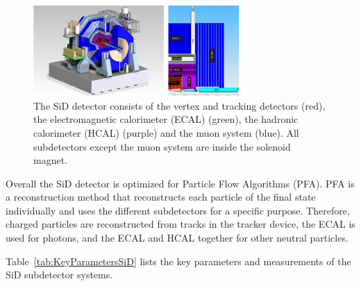 \begin{figure}
\centering
\includegraphics[width=0.7\textwidth]{Figures/SiD.png}
\caption[Schematic drawing of the SiD detector]{The SiD detector consists of the vertex and tracking detectors (red), the electromagnetic calorimeter (ECAL) (green), the hadronic calorimeter (HCAL) (purple) and the muon system (blue). All subdetectors except the muon system are inside the solenoid magnet.\cite[p. 31]{TDR1}}
\label{fig:SiD}
\end{figure}

Overall the SiD detector is optimized for Particle Flow Algorithms (PFA).
PFA is a reconstruction method that reconstructs each particle of the final state individually and uses the different subdetectors for a specific purpose.
Therefore, charged particles are reconstructed from tracks in the tracker device, the ECAL is used for photons, and the ECAL and HCAL together for other neutral particles. 

Table~\ref{tab:KeyParametersSiD} lists the key parameters and measurements of the SiD subdetector systems.

